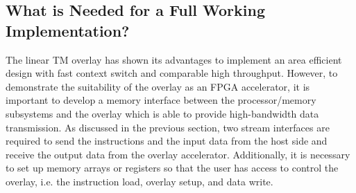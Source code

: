 \subsection{What is Needed for a Full Working Implementation?}
The linear TM overlay has shown its advantages to implement an area efficient design with fast context switch and comparable high throughput. 
However, to demonstrate the suitability of the overlay as an FPGA accelerator, it is important to develop a memory interface between the processor/memory subsystems and the overlay which is able to provide high-bandwidth data transmission. 
As discussed in the previous section, two stream interfaces are required to send the instructions and the input data from the host side and receive the output data from the overlay accelerator. 
Additionally, it is necessary to set up memory arrays or registers so that the user has access to control the overlay, i.e. the instruction load, overlay setup, and data write. 

